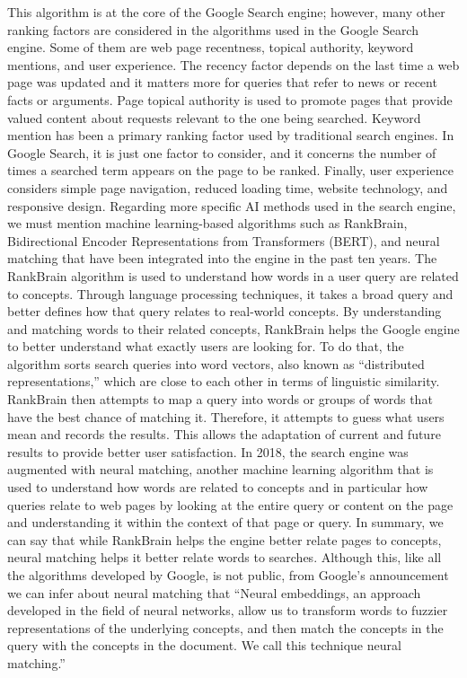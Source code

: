 This algorithm is at the core of the Google Search engine; however, many other ranking factors are considered in the algorithms used in the Google Search engine. Some of them are web page recentness, topical authority, keyword mentions, and user experience. The recency factor depends on the last time a web page was updated and it matters more for queries that refer to news or recent facts or arguments. Page topical authority is used to promote pages that provide valued content about requests relevant to the one being searched. Keyword mention has been a primary ranking factor used by traditional search engines. In Google Search, it is just one factor to consider, and it concerns the number of times a searched term appears on the page to be ranked. Finally, user experience considers simple page navigation, reduced loading time, website technology, and responsive design. Regarding more specific AI methods used in the search engine, we must mention machine learning-based algorithms such as RankBrain, Bidirectional Encoder Representations from Transformers (BERT), and neural matching that have been integrated into the engine in the past ten years. The RankBrain algorithm is used to understand how words in a user query are related to concepts. Through language processing techniques, it takes a broad query and better defines how that query relates to real-world concepts. By understanding and matching words to their related concepts, RankBrain helps the Google engine to better understand what exactly users are looking for. To do that, the algorithm sorts search queries into word vectors, also known as ``distributed representations,'' which are close to each other in terms of linguistic similarity. RankBrain then attempts to map a query into words or groups of words that have the best chance of matching it. Therefore, it attempts to guess what users mean and records the results. This allows the adaptation of current and future results to provide better user satisfaction. In 2018, the search engine was augmented with neural matching, another machine learning algorithm that is used to understand how words are related to concepts and in particular how queries relate to web pages by looking at the entire query or content on the page and understanding it within the context of that page or query. In summary, we can say that while RankBrain helps the engine better relate pages to concepts, neural matching helps it better relate words to searches. Although this, like all the algorithms developed by Google, is not public, from Google's announcement we can infer about neural matching that ``Neural embeddings, an approach developed in the field of neural networks, allow us to transform words to fuzzier representations of the underlying concepts, and then match the concepts in the query with the concepts in the document. We call this technique neural matching.''



